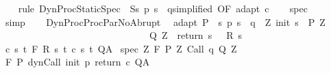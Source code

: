 \begin{isabellebody}
%
\isadelimproof
\ \ %
\endisadelimproof
%
\isatagproof
{}\isamarkupfalse%
\ {\isacharparenleft}rule\ DynProcStaticSpec\ {\isacharbrackleft}\ S{\isacharequal}{\isachardoublequoteopen}{\isacharbraceleft}s{\isachardot}\ p\ s\ {\isacharequal}\ q{\isacharbraceright}{\isachardoublequoteclose}{\isacharcomma}simplified{\isacharcomma}\ OF\ adapt\ c{\isacharbrackright}{\isacharparenright}\isanewline
\ \ \isamarkupfalse%
\ spec\isanewline
\ \ \isamarkupfalse%
\ simp\isanewline
\ \ \isamarkupfalse%
%
\endisatagproof
{\isafoldproof}%
%
\isadelimproof
\isanewline
%
\endisadelimproof
\isanewline
\isanewline
{}\isamarkupfalse%
\ DynProcProcParNoAbrupt{\isacharcolon}\ \isanewline
{}\ adapt{\isacharcolon}\ {\isachardoublequoteopen}P\ {\isasymsubseteq}\ {\isacharbraceleft}s{\isachardot}\ p\ s\ {\isacharequal}\ q\ {\isasymand}\ {\isacharparenleft}{\isasymexists}Z{\isachardot}\ init\ s\ {\isasymin}\ P{\isacharprime}\ Z\ \ {\isasymand}\ \isanewline
\ \ \ \ \ \ \ \ \ \ \ \ \ \ \ \ \ \ \ \ \ \ \ \ \ \ \ \ {\isacharparenleft}{\isasymforall}{\isasymtau}{\isachardot}\ {\isasymtau}\ {\isasymin}\ Q{\isacharprime}\ Z\ {\isasymlongrightarrow}\ return\ s\ {\isasymtau}\ {\isasymin}\ R\ s\ {\isasymtau}{\isacharparenright}{\isacharparenright}{\isacharbraceright}{\isachardoublequoteclose}\isanewline
{}\ c{\isacharcolon}\ {\isachardoublequoteopen}{\isasymforall}s\ t{\isachardot}\ {\isasymGamma}{\isacharcomma}{\isasymTheta}{\isasymturnstile}\isactrlbsub {\isacharslash}F\isactrlesub \ {\isacharparenleft}R\ s\ t{\isacharparenright}\ {\isacharparenleft}c\ s\ t{\isacharparenright}\ Q{\isacharcomma}A{\isachardoublequoteclose}\isanewline
{}\ spec{\isacharcolon}\ {\isachardoublequoteopen}{\isasymforall}Z{\isachardot}\ {\isasymGamma}{\isacharcomma}{\isasymTheta}{\isasymturnstile}\isactrlbsub {\isacharslash}F\isactrlesub \ {\isacharparenleft}P{\isacharprime}\ Z{\isacharparenright}\ Call\ q\ {\isacharparenleft}Q{\isacharprime}\ Z{\isacharparenright}{\isacharcomma}{\isacharbraceleft}{\isacharbraceright}{\isachardoublequoteclose}\isanewline
{}\ {\isachardoublequoteopen}{\isasymGamma}{\isacharcomma}{\isasymTheta}{\isasymturnstile}\isactrlbsub {\isacharslash}F\isactrlesub \ P\ {\isacharparenleft}dynCall\ init\ p\ return\ c{\isacharparenright}\ Q{\isacharcomma}A{\isachardoublequoteclose}\isanewline
%
\isadelimproof
%
\endisadelimproof
%
\isatagproof
{}\isamarkupfalse%
\ {\isacharminus}\ \ \isanewline
\ \ \isamarkupfalse%

\end{isabellebody}
